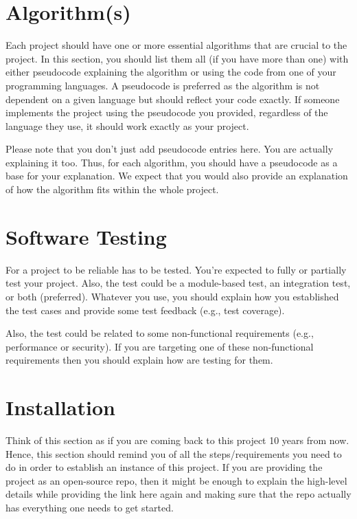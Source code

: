 
\section{Algorithm(s)} %
\label{sec:algorihtms}

Each project should have one or more essential algorithms that are crucial to the project. In this section, you should list them all (if you have more than one) with either pseudocode explaining the algorithm or using the code from one of your programming languages. A pseudocode is preferred as the algorithm is not dependent on a given language but should reflect your code exactly. If someone implements the project using the pseudocode you provided, regardless of the language they use, it should work exactly as your project. 

Please note that you don't just add pseudocode entries here. You are actually explaining it too. Thus, for each algorithm, you should have a pseudocode as a base for your explanation. We expect that you would also provide an explanation of how the algorithm fits within the whole project.


\section{Software Testing} %
\label{sec:software-testing}

For a project to be reliable has to be tested. You're expected to fully or partially test your project. Also, the test could be a module-based test, an integration test, or both (preferred). Whatever you use, you should explain how you established the test cases and provide some test feedback (e.g., test coverage).

Also, the test could be related to some non-functional requirements (e.g., performance or security). If you are targeting one of these non-functional requirements then you should explain how are testing for them.


\section{Installation} %
\label{sec:installation}

Think of this section as if you are coming back to this project 10 years from now. Hence, this section should remind you of all the steps/requirements you need to do in order to establish an instance of this project. If you are providing the project as an open-source repo, then it might be enough to explain the high-level details while providing the link here again and making sure that the repo actually has everything one needs to get started.


